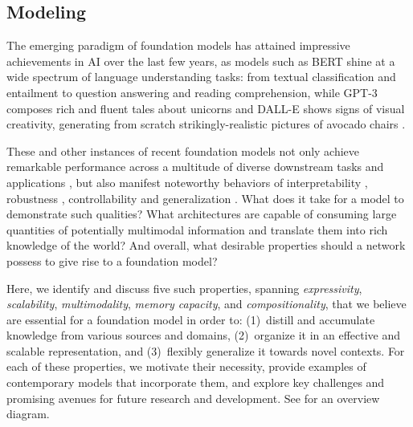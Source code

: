 
\newsection 
\subsection{Modeling}
\label{sec:modeling}


The emerging paradigm of foundation models has attained impressive achievements in AI over the last few years, as models such as BERT \citep{devlin2019bert} shine at a wide spectrum of language understanding tasks: from textual classification and entailment to question answering and reading comprehension, while GPT-3 composes rich and fluent tales about unicorns \citep{brown2020gpt3} and DALL-E  shows signs of visual creativity, generating from scratch strikingly-realistic pictures of avocado chairs \citep{ramesh2021zeroshot}.

These and other instances of recent foundation models not only achieve remarkable performance across a multitude of diverse downstream tasks and applications \citep{squad2,wang2019superglue}, but also manifest noteworthy behaviors of interpretability \citep{stylegan2}, robustness \citep{devlin2019bert}, controllability \citep{styleclip} and generalization \citep{brown2020gpt3}. What does it take for a model to demonstrate such qualities? What architectures are capable of consuming large quantities of potentially multimodal information and translate them into rich knowledge of the world? And overall, what desirable properties should a network possess to give rise to a foundation model?

Here, we identify and discuss five such properties, spanning \textit{expressivity}, \textit{scalability}, \textit{multimodality}, \textit{memory capacity}, and \textit{compositionality}, that we believe are essential for a foundation model in order to: (1)~distill and accumulate knowledge from various sources and domains, (2)~organize it in an effective and scalable representation, and (3)~flexibly generalize it towards novel contexts.  For each of these properties, we motivate their necessity, provide examples of contemporary  models that incorporate them, and explore key challenges and promising avenues  for future research and development. See  for an overview diagram.

